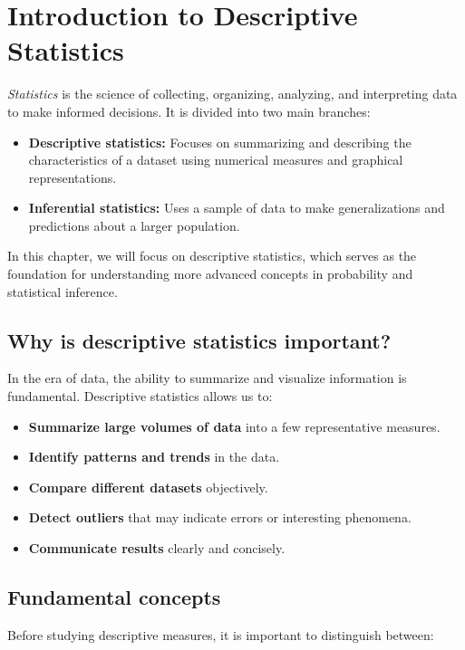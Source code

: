 \section{Introduction to Descriptive Statistics}

\emph{Statistics} is the science of collecting, organizing, analyzing, and interpreting data to make informed decisions. It is divided into two main branches:

\begin{itemize}
	\item \textbf{Descriptive statistics:} Focuses on summarizing and describing the characteristics of a dataset using numerical measures and graphical representations.
	\item \textbf{Inferential statistics:} Uses a sample of data to make generalizations and predictions about a larger population.
\end{itemize}

In this chapter, we will focus on descriptive statistics, which serves as the foundation for understanding more advanced concepts in probability and statistical inference.

\subsection{Why is descriptive statistics important?}

In the era of data, the ability to summarize and visualize information is fundamental. Descriptive statistics allows us to:

\begin{itemize}
	\item \textbf{Summarize large volumes of data} into a few representative measures.
	\item \textbf{Identify patterns and trends} in the data.
	\item \textbf{Compare different datasets} objectively.
	\item \textbf{Detect outliers} that may indicate errors or interesting phenomena.
	\item \textbf{Communicate results} clearly and concisely.
\end{itemize}

\subsection{Fundamental concepts}

Before studying descriptive measures, it is important to distinguish between:

